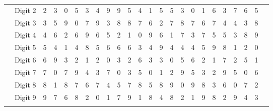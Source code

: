\begin{table*}[h]
{\begin{tabular}{c c c c cccccccccccccccccccc}
        & Digit 2 & 2 & 3 & 0 & 5 & 3 & 4 & 9 & 9 & 5 & 4 & 1 & 5 & 5 & 3 & 0 & 1 & 6 & 3 & 7 & 6 & 5 \\
        & Digit 3 & 3 &  5 & 9 & 0 & 7 & 9 & 3 & 8 & 8 & 7 & 6 & 2 & 7 & 8 & 7 & 6 & 7 & 4 & 4 & 3 & 8 \\
        & Digit 4 & 4 & 6 & 2 & 6 & 9 & 6 & 5 & 2 & 1 & 0 & 9 & 6 & 1 & 7 & 3 & 7 & 5 & 5 & 3 & 8 & 9 \\
        & Digit 5 & 5 & 4 & 1 & 4 & 8 & 5 & 6 & 6 & 6 & 3 & 4 & 9 & 4 & 4 & 4 & 5 & 9 & 8 & 1 & 2 & 0 \\
        & Digit 6 & 6 & 9 & 3 & 2 & 1 & 2 & 0 & 3 & 2 & 6 & 3 & 3 & 0 & 5 & 6 & 2 & 1 & 7 & 2 & 5 & 1 \\
        & Digit 7 & 7 & 0 & 7 & 9 & 4 & 3 & 7 & 0 & 3 & 5 & 0 & 1 & 2 & 9 & 5 & 3 & 2 & 9 & 5 & 0 & 6 \\
        & Digit 8 & 8 & 1 & 8 & 7 & 6 & 7 & 4 & 5 & 7 & 8 & 5 & 8 & 9 & 0 & 9 & 8 & 3 & 6 & 0 & 7 & 2 \\
        & Digit 9 & 9 & 7 & 6 & 8 & 2 & 0 & 1 & 7 & 9 & 1 & 8 & 4 & 8 & 2 & 1 & 9 & 8 & 2 & 9 & 4 & 3 \\
        \midrule
        \bottomrule 
    \label{tbl:dataset_1}
    \end{tabular}}
\end{table*}

